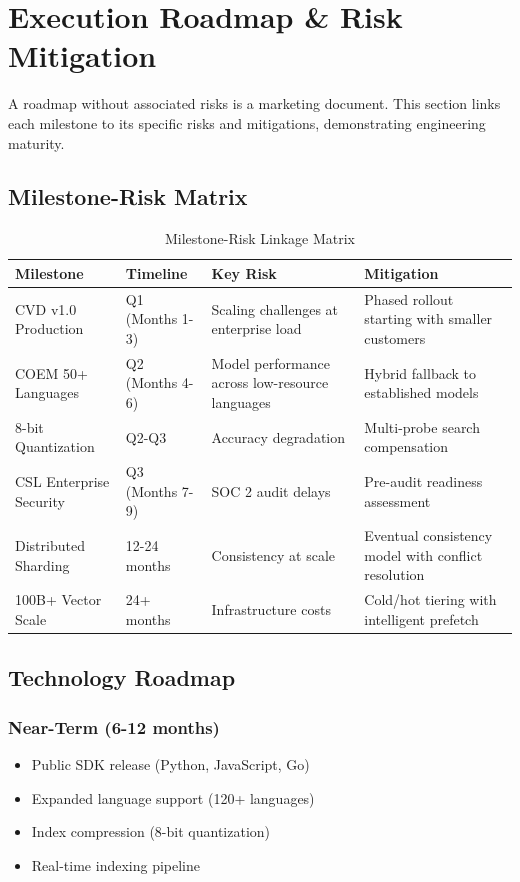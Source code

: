 \section{Execution Roadmap \& Risk Mitigation}

A roadmap without associated risks is a marketing document. This section links each milestone to its specific risks and mitigations, demonstrating engineering maturity.

\subsection{Milestone-Risk Matrix}

\begin{table}[ht]
\centering
\small
\begin{tabular}{|p{3cm}|p{3.5cm}|p{3.5cm}|p{3.5cm}|}
\hline
\textbf{Milestone} & \textbf{Timeline} & \textbf{Key Risk} & \textbf{Mitigation} \\
\hline
CVD v1.0 Production & Q1 (Months 1-3) & Scaling challenges at enterprise load & Phased rollout starting with smaller customers \\
\hline
COEM 50+ Languages & Q2 (Months 4-6) & Model performance across low-resource languages & Hybrid fallback to established models \\
\hline
8-bit Quantization & Q2-Q3 & Accuracy degradation & Multi-probe search compensation \\
\hline
CSL Enterprise Security & Q3 (Months 7-9) & SOC 2 audit delays & Pre-audit readiness assessment \\
\hline
Distributed Sharding & 12-24 months & Consistency at scale & Eventual consistency model with conflict resolution \\
\hline
100B+ Vector Scale & 24+ months & Infrastructure costs & Cold/hot tiering with intelligent prefetch \\
\hline
\end{tabular}
\caption{Milestone-Risk Linkage Matrix}
\end{table}

\subsection{Technology Roadmap}

\subsubsection{Near-Term (6-12 months)}
\begin{itemize}[noitemsep]
    \item Public SDK release (Python, JavaScript, Go)
    \item Expanded language support (120+ languages)
    \item Index compression (8-bit quantization)
    \item Real-time indexing pipeline
\end{itemize}

